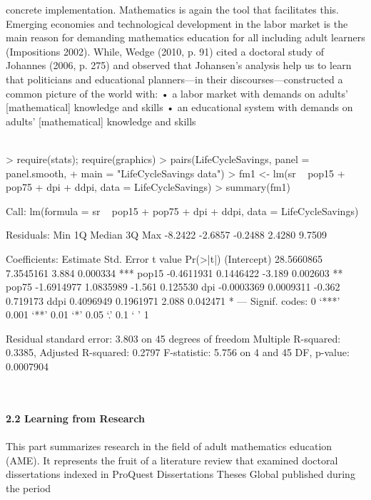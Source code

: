 \documentclass{article}
\begin{document}
concrete implementation. Mathematics is again the tool that facilitates this.
Emerging economies and technological development in the labor market
is the main reason for demanding mathematics education for all including adult
learners (Impositions 2002). While, Wedge (2010, p. 91) cited a doctoral study of
 Johannes (2006, p. 275) and observed that Johansen’s analysis help us to learn that
 politicians and educational planners—in their discourses—constructed a common
 picture of the world with:
 • a labor market with demands on adults’ [mathematical] knowledge and skills
 • an educational system with demands on adults’ [mathematical] knowledge and skills
\textit{\\\\}
\begin{Schunk}
\begin{Sinput}
> require(stats); require(graphics)
> pairs(LifeCycleSavings, panel = panel.smooth,
+       main = "LifeCycleSavings data")
> fm1 <- lm(sr ~ pop15 + pop75 + dpi + ddpi, data = LifeCycleSavings)
> summary(fm1)
\end{Sinput}
\begin{Soutput}
Call:
lm(formula = sr ~ pop15 + pop75 + dpi + ddpi, data = LifeCycleSavings)

Residuals:
    Min      1Q  Median      3Q     Max 
-8.2422 -2.6857 -0.2488  2.4280  9.7509 

Coefficients:
              Estimate Std. Error t value Pr(>|t|)    
(Intercept) 28.5660865  7.3545161   3.884 0.000334 ***
pop15       -0.4611931  0.1446422  -3.189 0.002603 ** 
pop75       -1.6914977  1.0835989  -1.561 0.125530    
dpi         -0.0003369  0.0009311  -0.362 0.719173    
ddpi         0.4096949  0.1961971   2.088 0.042471 *  
---
Signif. codes:  0 ‘***’ 0.001 ‘**’ 0.01 ‘*’ 0.05 ‘.’ 0.1 ‘ ’ 1

Residual standard error: 3.803 on 45 degrees of freedom
Multiple R-squared:  0.3385,	Adjusted R-squared:  0.2797 
F-statistic: 5.756 on 4 and 45 DF,  p-value: 0.0007904
\end{Soutput}
\end{Schunk}
\textit{\\\\}
\textbf{ 2.2 Learning from Research }
\textit{\\\\}
 This part summarizes research in the field of adult mathematics education (AME).
 It represents the fruit of a literature review that examined doctoral dissertations
 indexed in ProQuest Dissertations Theses Global published during the period
\end{document}
